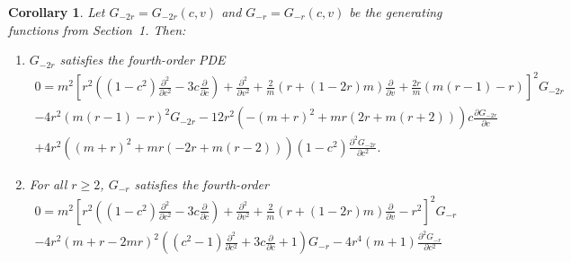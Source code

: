 \documentclass[final,nopreprintline]{elsarticle}
\newtheorem{corollary}[theorem]{Corollary}
\theoremstyle{definition}
\numberwithin{equation}{section}
\theoremstyle{remark}
\begin{document}
\begin{corollary}\label{cor:main-pde}
Let $G_{-2r}=G_{-2r}(c,v)$ and $G_{-r}=G_{-r}(c,v)$ be the generating functions from
Section~1. Then:
\begin{enumerate}[\rm(i)]
\item $G_{-2r}$ satisfies the fourth-order PDE
\begin{multline}
0=m^2\left[r^2\left((1-c^2)\frac{\partial^2 }{\partial c^2}-3 c\frac{\partial }{\partial c}\right)+\frac{\partial^2 }{\partial v^2} +\frac{2}{m} (r+(1-2r)m)\frac{\partial }{\partial v}+\frac{2r}{m}(m(r-1)-r)\right]^2 G_{-2r}\\
-4r^2(m(r-1)-r)^2 G_{-2r} -12r^2(-(m+r)^2+mr(2r+m(r+2)))c\frac{\partial G_{-2r}}{\partial c}\\
+4r^2((m+r)^2+mr(-2r+m(r-2))) (1-c^2)\frac{\partial^2 G_{-2r} }{\partial c^2}. \label{eqn:P_2PDE}
\end{multline}
\item For all $r\ge2$, $G_{-r}$ satisfies the fourth-order 
\begin{multline}
0=m^2\left[r^2\left((1-c^2)\frac{\partial^2 }{\partial c^2}-3 c\frac{\partial }{\partial c}\right)+\frac{\partial^2 }{\partial v^2} +\frac{2}{m} (r+(1-2r)m)\frac{\partial }{\partial v}-r^2\right]^2 G_{-r}\nonumber\\
-4 r^2(m+r-2mr)^2 \left( (c^2-1)\frac{\partial^2 }{\partial c^2}+3 c\frac{\partial }{\partial c}+1\right) G_{-r}- 4 r^4(m+1)\frac{\partial^2 G_{-r}}{\partial c^2}\label{eqn:P_type2PDE_general}
\end{multline}


\end{enumerate}
\end{corollary}
\end{document}
